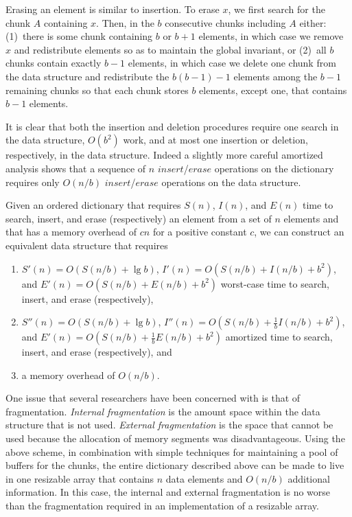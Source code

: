 \documentclass{DIKU-article}
\newcommand{\Insert}{\mbox{$\mathit{insert}$}}
\newcommand{\Erase}{\mbox{$\mathit{erase}$}}
\begin{document}
Erasing an element is similar to insertion. To erase $x$, we first
search for the chunk $A$ containing $x$. Then, in the $b$ consecutive
chunks including $A$ either: (1)~there is some chunk containing $b$ or
$b+1$ elements, in which case we remove $x$ and redistribute elements
so as to maintain the global invariant, or (2)~all $b$ chunks contain
exactly $b-1$ elements, in which case we delete one chunk from the
data structure and redistribute the $b(b-1)-1$ elements among the $b-1$
remaining chunks so that each chunk stores $b$ elements, except one,
that contains $b-1$ elements.

It is clear that both the insertion and deletion procedures require
one search in the data structure, $O(b^2)$ work, and at most one
insertion or deletion, respectively, in the data structure.  Indeed a
slightly more careful amortized analysis shows that a sequence of $n$
\Insert/\Erase{} operations on the dictionary requires only $O(n/b)$
\Insert/\Erase{} operations on the data structure.  

\begin{theorem}
\label{theorem:elementary-a}
Given an ordered dictionary that requires $S(n)$, $I(n)$, and $E(n)$
time to search, insert, and erase (respectively) an element from a
set of $n$ elements and that has a memory overhead of $cn$ for a
positive constant $c$, we can construct an equivalent data structure
that requires
\begin{enumerate}
\item $S'(n)=O(S(n/b)+\lg b)$, $I'(n)=O(S(n/b)+I(n/b)+b^2)$,
and $E'(n)=O(S(n/b)+E(n/b)+b^2)$ worst-case time to search, insert,
and erase (respectively), 
\item $S''(n)=O(S(n/b)+\lg b)$,
$I''(n)=O(S(n/b)+\frac{1}{b}I(n/b)+b^2)$, and
$E'(n)=O(S(n/b)+\frac{1}{b}E(n/b)+b^2)$ amortized time to search,
insert, and erase (respectively), and 
\item a memory overhead of $O(n/b)$.
\end{enumerate}
\end{theorem}

One issue that several researchers have been concerned with is that of
fragmentation. \emph{Internal fragmentation} is the amount space
within the data structure that is not used.  \emph{External
fragmentation} is the space that cannot be used because the allocation
of memory segments was disadvantageous.  Using the above scheme, in
combination with simple techniques for maintaining a pool of buffers
for the chunks, the entire dictionary described above can be made to
live in one resizable array that contains $n$ data elements and
$O(n/b)$ additional information.  In this case, the internal and
external fragmentation is no worse than the fragmentation required in
an implementation of a resizable array.
\end{document}
